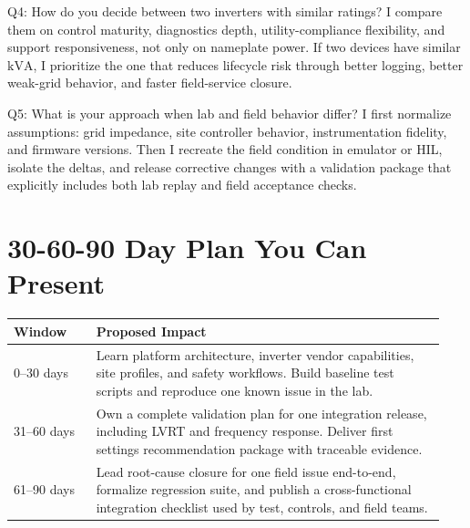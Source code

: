 \documentclass[11pt]{article}
\newcommand{\kVA}{\mathrm{kVA}}
\begin{document}
\begin{answerbox}{Q4: How do you decide between two inverters with similar ratings?}
I compare them on control maturity, diagnostics depth, utility-compliance
flexibility, and support responsiveness, not only on nameplate power. If two
devices have similar \(\kVA\), I prioritize the one that reduces lifecycle risk
through better logging, better weak-grid behavior, and faster field-service
closure.
\end{answerbox}

\begin{answerbox}{Q5: What is your approach when lab and field behavior differ?}
I first normalize assumptions: grid impedance, site controller behavior,
instrumentation fidelity, and firmware versions. Then I recreate the field
condition in emulator or HIL, isolate the deltas, and release corrective changes
with a validation package that explicitly includes both lab replay and field
acceptance checks.
\end{answerbox}

\section{30-60-90 Day Plan You Can Present}

\begin{longtable}{p{0.18\linewidth}p{0.76\linewidth}}
\toprule
Window & Proposed Impact \\
\midrule
0--30 days & Learn platform architecture, inverter vendor capabilities, site profiles, and safety workflows. Build baseline test scripts and reproduce one known issue in the lab. \\
31--60 days & Own a complete validation plan for one integration release, including LVRT and frequency response. Deliver first settings recommendation package with traceable evidence. \\
61--90 days & Lead root-cause closure for one field issue end-to-end, formalize regression suite, and publish a cross-functional integration checklist used by test, controls, and field teams. \\
\bottomrule
\end{longtable}
\end{document}
